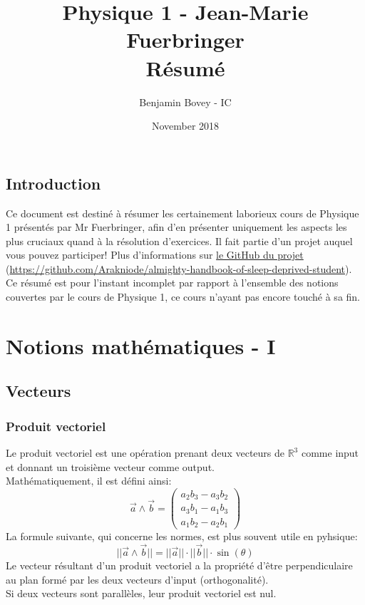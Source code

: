 \documentclass{article}
\title{\vspace{-1.5cm} Physique 1 - Jean-Marie Fuerbringer \\ Résumé}
\author{Benjamin Bovey - IC}
\date{November 2018}
\numberwithin{equation}{section}
\begin{document}
\maketitle

\subsection*{Introduction}
Ce document est destiné à résumer les certainement laborieux cours de Physique 1 présentés par Mr Fuerbringer, afin d'en présenter uniquement les aspects les plus cruciaux quand à la résolution d'exercices. Il fait partie d'un projet auquel vous pouvez participer! Plus d'informations sur \href{https://github.com/Arakniode/almighty-handbook-of-sleep-deprived-student}{le GitHub du projet} (\url{https://github.com/Arakniode/almighty-handbook-of-sleep-deprived-student}). \\
Ce résumé est pour l'instant incomplet par rapport à l'ensemble des notions couvertes par le cours de Physique 1, ce cours n'ayant pas encore touché à sa fin. 

\section{Notions mathématiques - I}

\subsection{Vecteurs}

\subsubsection{Produit vectoriel}

Le produit vectoriel est une opération prenant deux vecteurs de \(\mathbb{R}^3\) comme input et donnant un troisième vecteur comme output. \\ %
Mathématiquement, il est défini ainsi:
\begin{equation}
	\vec a \wedge \vec b = \begin{pmatrix}a_2b_3 - a_3b_2 \\ a_3b_1 - a_1b_3 \\ a_1b_2 - a_2b_1\end{pmatrix}
\end{equation}
La formule suivante, qui concerne les normes, est plus souvent utile en pyhsique:
\begin{equation}
	\boxed{ ||\vec a \wedge \vec b|| = ||\vec a|| \cdot ||\vec b|| \cdot \sin(\theta) }
\end{equation}
Le vecteur résultant d'un produit vectoriel a la propriété d'être perpendiculaire au plan formé par les deux vecteurs d'input (orthogonalité).\\
Si deux vecteurs sont parallèles, leur produit vectoriel est nul. \\
\end{document}
